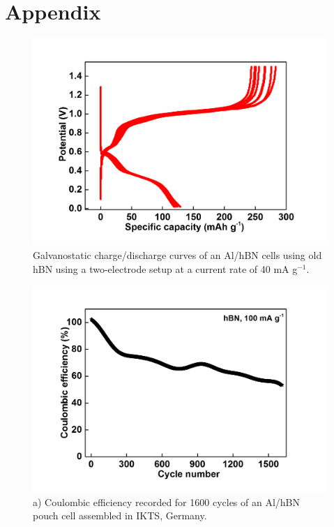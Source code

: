 \chapter{Appendix} %
\label{appA} %

\begin{figure}[tbh!]
\centering
\includegraphics[width=\textwidth]{Figures/appendix/hBNrepeat}
\caption{Galvanostatic charge/discharge curves of an Al/hBN cells using old hBN using a two-electrode setup at a current rate of 40 mA g$^{-1}$. }
\label{Figures/appendix:hBNrepeat}
\end{figure}

\begin{figure}[tbh!]
\centering
\includegraphics[width=\textwidth]{Figures/appendix/pouchCE}
\caption{a) Coulombic efficiency recorded for 1600 cycles of an Al/hBN pouch cell assembled in IKTS, Germany.}
\label{Figures/appendix:pouchCE}
\end{figure}

